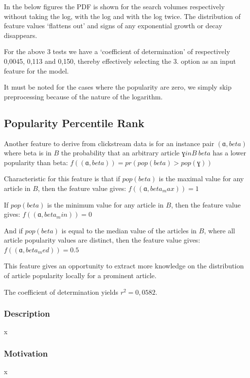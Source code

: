 In the below figures the PDF is shown for the search volumes respectively without taking the log, with the log and with the log twice. The distribution of feature values `flattens out' and signs of any exponential growth or decay disappears.

For the above 3 tests we have a `coefficient of determination' of respectively 0,0045, 0,113 and 0,150, thereby effectively selecting the 3. option as an input feature for the model.

It must be noted for the cases where the popularity are zero, we simply skip preprocessing because of the nature of the logarithm.





\subsection{Popularity Percentile Rank}


Another feature to derive from clickstream data is for an instance pair $( ɑ , beta)$ where beta is in $B$ the probability that an arbitrary article $ɣ in B \ { beta }$ has a lower popularity than beta:
$f( ( ɑ , beta) ) = pr( pop(beta) > pop(ɣ) )$

Characteristic for this feature is that if $pop(beta)$ is the maximal value for any article in $B$, then the feature value gives:
$f( ( ɑ , beta_max) ) = 1$

If $pop(beta)$ is the minimum value for any article in $B$, then the feature value gives:
$f( ( ɑ , beta_min) ) = 0$

And if $pop(beta)$ is equal to the median value of the articles in $B$, where all article popularity values are distinct, then the feature value gives:
$f( ( ɑ , beta_med) ) = 0.5$

This feature gives an opportunity to extract more knowledge on the distribution of article popularity locally for a prominent article.

The coefficient of determination yields $r^2 = 0,0582$.

\subsubsection{Description}
x
\subsubsection{Motivation}
x
